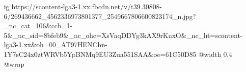  
 
 
 
 

\ifcmt
  ig https://scontent-lga3-1.xx.fbcdn.net/v/t39.30808-6/269436662_4562336973801377_2549667806600823174_n.jpg?_nc_cat=106&ccb=1-5&_nc_sid=8bfeb9&_nc_ohc=XsVaqDDYg3kAX9rKnxO&_nc_ht=scontent-lga3-1.xx&oh=00_AT97HENChn-1Y7sC24x0ztWRVb5YpBNMq9EU3Zua551SAA&oe=61C50D85
  @width 0.4
  @wrap 
\fi
